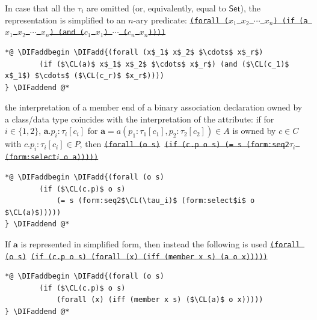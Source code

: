 \documentclass[10pt,fleqn,final]{scrreprt}
\newcommand*{\CL}{\ensuremath{\mathsf{CL}}\xspace}
\newcommand{\white}[1]{{\color{white}{#1}}}
\newcommand{\qqquad}{\white{x}\qquad}
\providecommand{\DIFadd}[1]{{\protect\color{blue}\uwave{#1}}} %
\providecommand{\DIFdel}[1]{{\protect\color{red}\sout{#1}}}                      %
\providecommand{\DIFaddbegin}{} %
\providecommand{\DIFaddend}{} %
\providecommand{\DIFdelbegin}{} %
\providecommand{\DIFdelend}{} %
\begin{document}
\begin{itemize}[topsep=0pt, label=--, leftmargin=*]
{In case that all the $\tau_i$ are omitted (or, equivalently, equal to 
$\mathsf{Set}$), the representation is simplified to an \DIFdelbegin \DIFdel{$n$}\DIFdelend \DIFaddbegin \DIFadd{$r$}\DIFaddend -ary predicate:
\DIFdelbegin %
\texttt{\DIFdel{(forall ($x_1$ $x_2$ $\cdots$  $x_n$) (if (a $x_1$ $x_2$ $\cdots$  $x_n$) (and ($c_1$ $x_1$) $\cdots$ ($c_n$ $x_n$))))}}
\DIFdelend %
 \begin{lstlisting}[language=clif, mathescape]
*@ \DIFaddbegin \DIFadd{(forall (x$_1$ x$_2$ $\cdots$ x$_r$)
        (if ($\CL(a)$ x$_1$ x$_2$ $\cdots$ x$_r$) (and ($\CL(c_1)$ x$_1$) $\cdots$ ($\CL(c_r)$ $x_r$))))
} \DIFaddend @*
\end{lstlisting}
   \item the interpretation of a member end of a binary association
declaration owned by a class/data type coincides with the interpretation
of the attribute: if for $i\in\{1,2\}$,
$\mathbf{a}.p_i : \tau_i[c_i]$
for $\mathbf{a} = a(p_1 : \tau_1[c_1], p_2 : \tau_2[c_2]) \in A$
is owned by $c \in C$ with $c.p_i : \tau_i[c_i] \in P$, then
\DIFdelbegin %
\texttt{\DIFdel{(forall (o s)}%
\DIFdel{(if (c.p o s) (= s (form:seq2$\tau_i$ (form:select$i$ o a)))))}}%
\DIFdelend %
 \begin{lstlisting}[language=clif, mathescape]
*@ \DIFaddbegin \DIFadd{(forall (o s)
        (if ($\CL(c.p)$ o s)
            (= s (form:seq2$\CL(\tau_i)$ (form:select$i$ o $\CL(a)$)))))
} \DIFaddend @*
\end{lstlisting}
 If $\mathbf{a}$ is represented in simplified form, then instead the
following is used
\DIFdelbegin %
\texttt{\DIFdel{(forall (o s)}%
\DIFdel{(if (c.p o s) (forall (x) (iff (member x s) (a o x)))))}}
\DIFdelend %
 \begin{lstlisting}[language=clif, mathescape]
*@ \DIFaddbegin \DIFadd{(forall (o s)
        (if ($\CL(c.p)$ o s)
            (forall (x) (iff (member x s) ($\CL(a)$ o x)))))
} \DIFaddend @*
\end{lstlisting}

}
\end{itemize}
\end{document}
